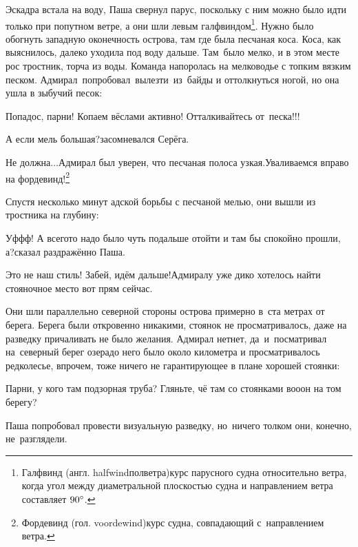 \renewcommand*{\thefootnote}{\arabic{footnote}}
\setcounter{footnote}{0}
Эскадра встала на воду, Паша свернул парус, поскольку с ним можно было идти только при попутном ветре, а они шли левым галфвиндом\footnote{Галфвинд (англ. halfwind\mdash полветра)\mdash курс парусного судна относительно ветра, когда угол между диаметральной плоскостью судна и направлением ветра составляет $90\degree$\cite{МорскойСправочник}.}. Нужно было обогнуть западную оконечность острова, там где была песчаная коса. Коса, как выяснилось, далеко уходила под воду дальше. Там~было мелко, и в этом месте рос тростник, торча из воды. Команда напоролась на мелководье с топким вязким песком. Адмирал~попробовал~вылезти~из~байды и оттолкнуться ногой, но она ушла в зыбучий песок:

\diagdash Попадос, парни! Копаем вёслами активно! Отталкивайтесь от~песка!!!

\diagdash А если мель большая?\mdash засомневался Серёга.

\diagdash Не должна$\ldots$\mdash Адмирал был уверен, что песчаная полоса узкая.\mdash Уваливаемся вправо на фордевинд!\footnote{Фордевинд (гол. voordewind)\mdash курс судна, совпадающий с~направлением ветра\cite{МорскойСправочник}.}

Спустя несколько минут адской борьбы с песчаной мелью, они вышли из тростника на глубину:

\diagdash Уф\sdash ф\sdash ф! А всего\sdash то надо было чуть подальше отойти и там бы спокойно прошли, а?\mdash сказал раздражённо Паша.

\diagdash Это не наш стиль! Забей, идём дальше!\mdash Адмиралу уже дико хотелось найти стояночное место вот прям сейчас. 

Они шли параллельно северной стороны острова примерно в~ста метрах от берега. Берега были откровенно никакими, стоянок не просматривалось, даже на разведку причаливать не было желания. Адмирал нет\sdash нет, да~и~посматривал на~северный берег озера\mdash до него было около километра и просматривалось редколесье, впрочем, тоже ничего не гарантирующее в плане хорошей стоянки:

\diagdash Парни, у кого там подзорная труба? Гляньте, чё там со стоянками во\sdash о\sdash он на том берегу?

Паша попробовал провести визуальную разведку, но~ничего толком они, конечно, не~разглядели.

